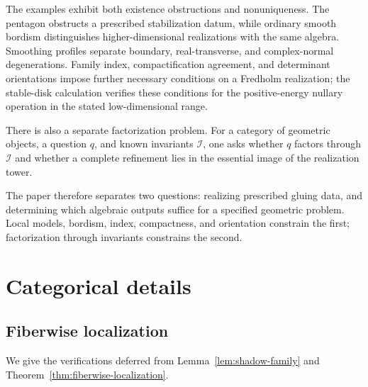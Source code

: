 \documentclass[11pt,letterpaper,twoside]{article}
\theoremstyle{plain}
\theoremstyle{definition}
\theoremstyle{remark}
\begin{document}
The examples exhibit both existence obstructions and nonuniqueness.  The pentagon obstructs a prescribed stabilization datum, while ordinary smooth bordism distinguishes higher-dimensional realizations with the same algebra.  Smoothing profiles separate boundary, real-transverse, and complex-normal degenerations.  Family index, compactification agreement, and determinant orientations impose further necessary conditions on a Fredholm realization; the stable-disk calculation verifies these conditions for the positive-energy nullary operation in the stated low-dimensional range.

There is also a separate factorization problem.  For a category of geometric objects, a question \(q\), and known invariants \(\mathcal I\), one asks whether \(q\) factors through \(\mathcal I\) and whether a complete refinement lies in the essential image of the realization tower.

The paper therefore separates two questions: realizing prescribed gluing data, and determining which algebraic outputs suffice for a specified geometric problem.  Local models, bordism, index, compactness, and orientation constrain the first; factorization through invariants constrains the second.

\appendix

\section{Categorical details}\label{app:categorical-details}

\subsection{Fiberwise localization}\label{app:fiberwise-details}

We give the verifications deferred from Lemma~\ref{lem:shadow-family} and Theorem~\ref{thm:fiberwise-localization}.
\end{document}
